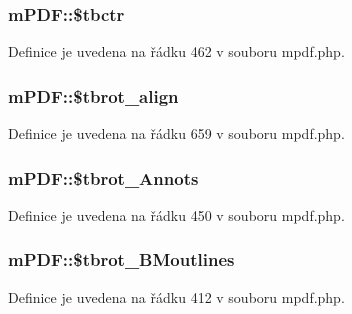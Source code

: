 \hypertarget{classm_p_d_f_ade264f15ad01c1d402a05877d12de0a6}{
\subsubsection[{\$tbctr}]{\setlength{\rightskip}{0pt plus 5cm}m\-P\-D\-F\-::\$tbctr}}\label{classm_p_d_f_ade264f15ad01c1d402a05877d12de0a6}


Definice je uvedena na řádku 462 v souboru mpdf.\-php.

\hypertarget{classm_p_d_f_abbe73513ed64f329f603476d6a39a88d}{
\subsubsection[{\$tbrot\-\_\-align}]{\setlength{\rightskip}{0pt plus 5cm}m\-P\-D\-F\-::\$tbrot\-\_\-align}}\label{classm_p_d_f_abbe73513ed64f329f603476d6a39a88d}


Definice je uvedena na řádku 659 v souboru mpdf.\-php.

\hypertarget{classm_p_d_f_a4dd0731ad660a45aa97230d646c6e68c}{
\subsubsection[{\$tbrot\-\_\-\-Annots}]{\setlength{\rightskip}{0pt plus 5cm}m\-P\-D\-F\-::\$tbrot\-\_\-\-Annots}}\label{classm_p_d_f_a4dd0731ad660a45aa97230d646c6e68c}


Definice je uvedena na řádku 450 v souboru mpdf.\-php.

\hypertarget{classm_p_d_f_a461839c2fac18376aa57b3e1c5a6ff72}{
\subsubsection[{\$tbrot\-\_\-\-B\-Moutlines}]{\setlength{\rightskip}{0pt plus 5cm}m\-P\-D\-F\-::\$tbrot\-\_\-\-B\-Moutlines}}\label{classm_p_d_f_a461839c2fac18376aa57b3e1c5a6ff72}


Definice je uvedena na řádku 412 v souboru mpdf.\-php.


